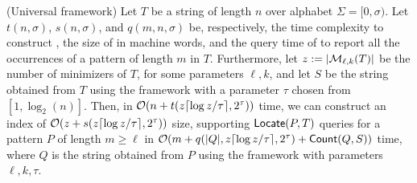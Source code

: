 \begin{theorem}(Universal framework)\label{the:framework}
Let $T$ be a string of length $n$ over alphabet
  $\Sigma=[0,\sigma)$. Let $t(n,\sigma)$, $s(n,\sigma)$, and $q(m,n,\sigma)$ be,
    respectively, the time complexity to construct \INDEX, the size of \INDEX in
    machine words, and the query time of \INDEX to report all the occurrences of
    a pattern of length $m$ in $T$.
    Furthermore, let $z:=|\mathcal{M}_{\ell,k}(T)|$ be the number of minimizers of $T$,
    for some parameters $\ell,k$, and let $S$ be the string obtained from $T$
    using the framework with a parameter $\tau$ chosen from $[1, \log_2(n)]$. Then, in
    $\mathcal{O}(n+t(z\lceil\log z/\tau\rceil,2^\tau))$ time, we can construct an
    index of $\mathcal{O}(z+s(z\lceil\log z/\tau\rceil,2^\tau))$ size,
    supporting $\textup{\textsf{Locate}}(P,T)$ queries for a pattern $P$ of length $m\geq \ell$ in $\mathcal{O}(m+q(|Q|,z\lceil\log z/\tau\rceil,2^\tau)+\textup{\textsf{Count}}(Q,S))$ time, where $Q$ is the string obtained from $P$ using the framework with parameters $\ell,k,\tau$. %
\end{theorem}


